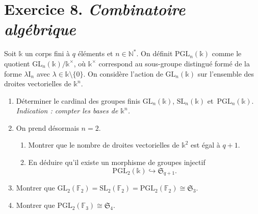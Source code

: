 \documentclass[./main]{subfiles}
\begin{document}
  \section{Exercice 8. \textit{Combinatoire algébrique}}

  \begin{enonce}
    Soit $\mathds{k}$ un corps fini à $q$ éléments et $n \in \mathds{N}^*$.
    On définit $\mathrm{PGL}_n(\mathds{k})$ comme le quotient $\mathrm{GL}_n(\mathds{k}) / \mathds{k}^\times$, où $\mathds{k}^\times$  correspond au sous-groupe distingué formé de la forme $\lambda \mathrm{I}_n$ avec $\lambda \in \mathds{k} \setminus \{0\}$.
    On considère l'action de $\mathrm{GL}_n(\mathds{k})$ sur l'ensemble des droites vectorielles de $\mathds{k}^n$.
    \begin{enumerate}
      \item Déterminer le cardinal des groupes finis $\mathrm{GL}_n(\mathds{k})$, $\mathrm{SL}_n(\mathds{k})$ et~$\mathrm{PGL}_n(\mathds{k})$.
        \textit{Indication : compter les bases de $\mathds{k}^n$.}
      \item On prend désormais $n = 2$.
        \begin{enumerate}
          \item Montrer que le nombre de droites vectorielles de $\mathds{k}^2$ est égal à $q + 1$.
        \item En déduire qu'il existe un morphisme de groupes injectif \[\mathrm{PGL}_2(\mathds{k}) \hookrightarrow \mathfrak{S}_{q+1}. \]
        \end{enumerate}
      \item Montrer que $\mathrm{GL}_2(\mathds{F}_2) = \mathrm{SL}_2(\mathds{F}_2) = \mathrm{PGL}_2(\mathds{F}_2) \cong \mathfrak{S}_3$.
      \item Montrer que $\mathrm{PGL}_2(\mathds{F}_3) \cong \mathfrak{S}_4$.
    \end{enumerate}
  \end{enonce}
\end{document}
